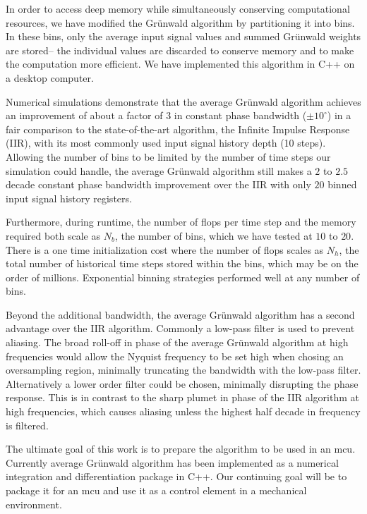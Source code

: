 In order to access deep memory while simultaneously conserving computational resources, we have modified the Gr{\"u}nwald algorithm by partitioning it into bins. In these bins, only the average input signal values and summed Gr{\"u}nwald weights are stored-- the individual values are discarded to conserve memory and to make the computation more efficient. We have implemented this algorithm in C++ on a desktop computer. 

Numerical simulations demonstrate that the average Gr{\"u}nwald algorithm achieves an improvement of about a factor of $3$ in constant phase bandwidth ($\pm 10^\circ$) in a fair comparison to the state-of-the-art algorithm, the Infinite Impulse Response (IIR), with its most commonly used input signal history depth (10 steps). Allowing the number of bins to be limited by the number of time steps our simulation could handle, the average Gr{\"u}nwald algorithm still makes a $2$ to $2.5$ decade constant phase bandwidth improvement over the IIR with only $20$ binned input signal history registers. 

Furthermore, during runtime, the number of flops per time step and the memory required both scale as $N_b$, the number of bins, which we have tested at $10$ to $20$. There is a one time initialization cost where the number of flops scales as $N_h$, the total number of historical time steps stored within the bins, which may be on the order of millions. Exponential binning strategies performed well at any number of bins. 

Beyond the additional bandwidth, the average Gr{\"u}nwald algorithm has a second advantage over the IIR algorithm. Commonly a low-pass filter is used to prevent aliasing. The broad roll-off  in phase of the average Gr{\"u}nwald algorithm at high frequencies would allow the Nyquist frequency to be set high when chosing an oversampling region, minimally truncating the bandwidth with the low-pass filter. Alternatively a lower order filter could be chosen, minimally disrupting the phase response. This is in contrast to the sharp plumet in phase of the IIR algorithm at high frequencies, which causes aliasing unless the highest half decade in frequency is filtered.

The ultimate goal of this work is to prepare the algorithm to be used in an mcu. Currently average Gr{\"u}nwald algorithm has been implemented as a numerical integration and differentiation package in C++. Our continuing goal will be to package it for an mcu and use it as a control element in a mechanical environment.  